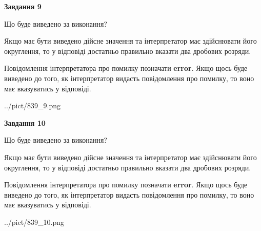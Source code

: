\documentclass[12pt, ukrainian]{article}
\begin{document}
{\begin {Large}
{\begin {center}\textbf{Завдання 9}\end {center}}\par
Що буде виведено за виконання? \par

Якщо має бути виведено дійсне значення та інтерпретатор має здійснювати його округлення, 
то у відповіді достатньо правильно вказати два дробових розряди.

Повідомлення інтерпретатора про помилку позначати \textbf{error}.
Якщо щось буде виведено до того, як інтерпретатор видасть повідомлення про помилку, 
то воно має вказуватись у відповіді. \par

\begin{center}
	{../pict/839_9.png}
\end{center}
\newpage

{\begin {center}\textbf{Завдання 10}\end {center}}\par
Що буде виведено за виконання? \par

Якщо має бути виведено дійсне значення та інтерпретатор має здійснювати його округлення, 
то у відповіді достатньо правильно вказати два дробових розряди.

Повідомлення інтерпретатора про помилку позначати \textbf{error}.
Якщо щось буде виведено до того, як інтерпретатор видасть повідомлення про помилку, 
то воно має вказуватись у відповіді. \par

\begin{center}
	{../pict/839_10.png}
\end{center}
\newpage

\end {Large}}
\end{document}
